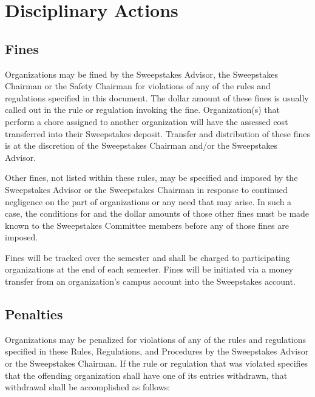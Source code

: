 \section{Disciplinary Actions}
\label{sec:DiciplinaryActions}

\subsection{Fines}

	Organizations may be fined by the Sweepstakes Advisor, the Sweepstakes Chairman or the Safety Chairman for violations of any of the rules and regulations specified in this document. The dollar amount of these fines is usually called out in the rule or regulation invoking the fine. Organization(s) that perform a chore assigned to another organization will have the assessed cost transferred into their Sweepstakes deposit. Transfer and distribution of these fines is at the discretion of the Sweepstakes Chairman and/or the Sweepstakes Advisor.

	Other fines, not listed within these rules, may be specified and imposed by the Sweepstakes Advisor or the Sweepstakes Chairman in response to continued negligence on the part of organizations or any need that may arise. In such a case, the conditions for and the dollar amounts of those other fines must be made known to the Sweepstakes Committee members before any of those fines are imposed.

	Fines will be tracked over the semester and shall be charged to participating organizations at the end of each semester. Fines will be initiated via a money transfer from an organization’s campus account into the Sweepstakes account.

\subsection{Penalties}

	Organizations may be penalized for violations of any of the rules and regulations specified in these Rules, Regulations, and Procedures by the Sweepstakes Advisor or the Sweepstakes Chairman. If the rule or regulation that was violated specifies that the offending organization shall have one of its entries withdrawn, that withdrawal shall be accomplished as follows:

